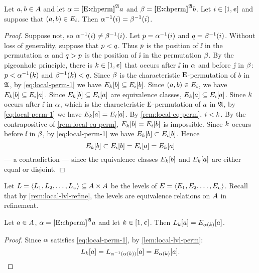 \begin{remark}\label{rem:local-inv-perm}
Let $a, b \in A$ and let
$\alpha = {\bm{[}\mathrm{E}\mathord{\bm{:}}\mathrm{chperm}\bm{]}}^{\mathfrak{A}}a$ and $\beta = {\bm{[}\mathrm{E}\mathord{\bm{:}}\mathrm{chperm}\bm{]}}^{\mathfrak{A}}b$.
Let $i \in [1,\upepsilon]$ and suppose that $(a, b) \in E_{i}$.
Then $\alpha^{-1}(i) = \beta^{-1}(i)$.
\end{remark}
\begin{proof}
Suppose not, so $\alpha^{-1}(i) \neq \beta^{-1}(i)$.
Let $p = \alpha^{-1}(i)$ and $q = \beta^{-1}(i)$.
Without loss of generality, suppose that $p < q$.
Thus $p$ is the position of $\ii$ in the permutation $\alpha$ and 
$q > p$ is the position of $\ii$ in the permutation $\beta$. 
By the pigeonhole principle, there is $k \in [1,\upepsilon]$ that occurs after $\ii$
in $\alpha$ and before $\jj$ in $\beta$:
$p < \alpha^{-1}(k)$ and $\beta^{-1}(k) < q$.
Since $\beta$ is the characteristic $\mathrm{E}$-permutation of $b$ in $\mathfrak{A}$, by
\cref{eq:local-perm-1} we have $E_{k}[b] \subseteq E_{i}[b]$.
Since $(a, b) \in E_{i}$, we have $E_{k}[b] \subseteq
E_{i}[a]$.
Since $E_{k}[b] \subseteq E_{i}[a]$ are equivalence classes,
$E_{k}[a] \subseteq E_{i}[a]$.
Since $k$ occurs after $\ii$ in $\alpha$, which is the characteristic
$\mathrm{E}$-permutation of $a$ in $\mathfrak{A}$, 
by \cref{eq:local-perm-1} we have $E_{k}[a] = E_{i}[a]$.
By \cref{rem:local-eq-perm}, $i < k$.
By the contrapositive of \cref{rem:local-eq-perm},
$E_{k}[b] = E_{i}[b]$ is impossible.
Since $k$ occurs before $\ii$ in $\beta$, 
by \cref{eq:local-perm-1} we have $E_{k}[b] \subset E_{i}[b]$.
Hence
\[
  E_{k}[b] \subset E_{i}[b] = E_{i}[a] = E_{k}[a]
\]
--- a contradiction --- since the equivalence classes $E_{k}[b]$ and
$E_{k}[a]$ are either equal or disjoint.
\end{proof}

Let
$L = \left\langle L_{1},L_{2},\dots,L_{\upepsilon} \right\rangle \subseteq {A\times A}$ be
the levels of $E = \left\langle E_{1}, E_{2}, \dots, E_{\upepsilon} \right\rangle$.
Recall that by \cref{rem:local-lvl-refine}, the levels are equivalence relations
on $A$ in refinement.

\begin{remark}\label{rem:local-lvl-perm}
Let $a \in A$, $\alpha = {\bm{[}\mathrm{E}\mathord{\bm{:}}\mathrm{chperm}\bm{]}}^{\mathfrak{A}}a$ and let $k \in [1,\upepsilon]$.
Then $L_{k}[a] = E_{\alpha(k)}[a]$.
\end{remark}
\begin{proof}
Since $\alpha$ satisfies \cref{eq:local-perm-1}, by \cref{lem:local-lvl-perm}:
\[
  L_{k}[a] = 
  L_{\alpha^{-1}(\alpha(k))}[a] =
  E_{\alpha(k)}[a].
\]
\end{proof}

